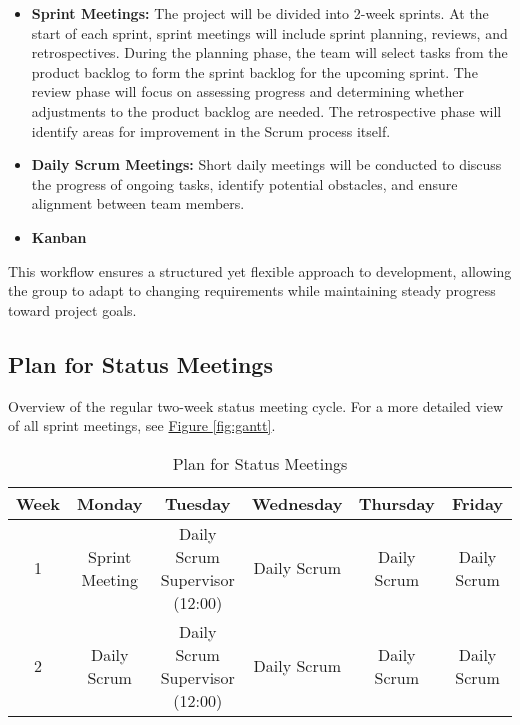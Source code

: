 \begin{itemize}
    \item \textbf{Sprint Meetings:} The project will be divided into 2-week sprints. At the start of each sprint, sprint meetings will include sprint planning, reviews, and retrospectives. During the planning phase, the team will select tasks from the product backlog to form the sprint backlog for the upcoming sprint. The review phase will focus on assessing progress and determining whether adjustments to the product backlog are needed. The retrospective phase will identify areas for improvement in the Scrum process itself.
    \item \textbf{Daily Scrum Meetings:} Short daily meetings will be conducted to discuss the progress of ongoing tasks, identify potential obstacles, and ensure alignment between team members.
    \item \textbf{Kanban} 
\end{itemize}

This workflow ensures a structured yet flexible approach to development, allowing the group to adapt to changing requirements while maintaining steady progress toward project goals.


\subsection{Plan for Status Meetings}
Overview of the regular two-week status meeting cycle. For a more detailed view of all sprint meetings, see \hyperref[fig:gantt]{Figure \ref*{fig:gantt}}.
\begin{table}[H]
    \centering
    \begin{tabular}{|c|c|c|c|c|c|}
    \hline
    Week & Monday & Tuesday & Wednesday & Thursday & Friday \\
    \hline
    1 & Sprint Meeting & \makecell{Daily Scrum \\ Supervisor (12:00)} & Daily Scrum & Daily 
    Scrum & Daily Scrum \\
    \hline
    2 & Daily Scrum & \makecell{Daily Scrum \\ Supervisor (12:00)} & Daily Scrum & Daily 
    Scrum & Daily Scrum \\
    \hline
    \end{tabular}
    \caption{Plan for Status Meetings}
    \label{tab:meeting_plan}
\end{table}
